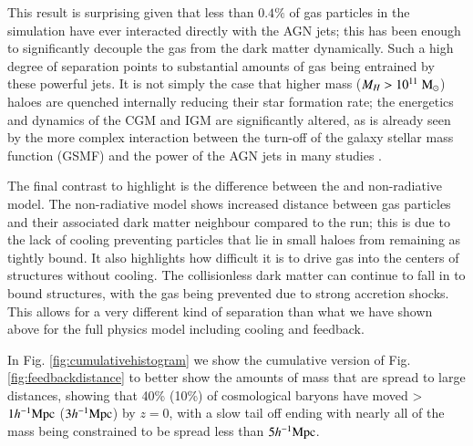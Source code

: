 This result is surprising given that less than $0.4\%$ of gas particles in
the simulation have ever interacted directly with the AGN jets; this has been
enough to significantly decouple the gas from the dark matter dynamically.
Such a high degree of separation points to substantial amounts of gas being
entrained by these powerful jets. It is not simply the case that higher mass
($M_H > 10^{11} \;{\rm M}_{\odot}{}$) haloes are quenched internally reducing their star
formation rate; the energetics and dynamics of the CGM and IGM are
significantly altered, as is already seen by the more complex interaction
between the turn-off of the galaxy stellar mass function (GSMF) and the power
of the AGN jets in many studies \citep{Weinberger2018, Dave2019}. 

The final contrast to highlight is the difference between the \nojet{} and
non-radiative model. The non-radiative model shows increased distance between
gas particles and their associated dark matter neighbour compared to the
\nojet{} run; this is due to the lack of cooling preventing particles that
lie in small haloes from remaining as tightly bound. It also highlights how
difficult it is to drive gas into the centers of structures without cooling.
The collisionless dark matter can continue to fall in to bound structures,
with the gas being prevented due to strong accretion shocks. This allows for
a very different kind of separation than what we have shown above for the
full physics model including cooling and feedback.


In Fig. \ref{fig:cumulativehistogram} we show the cumulative version of Fig.
\ref{fig:feedbackdistance} to better show the amounts of mass that are spread
to large distances, showing that 40\% (10\%) of cosmological baryons have
moved > $1h^{-1}{\rm Mpc}{}$ ($3h^{-1}{\rm Mpc}{}$) by $z = 0$, with a slow tail off ending with
nearly all of the mass being constrained to be spread less than $5h^{-1}{\rm Mpc}{}$.

